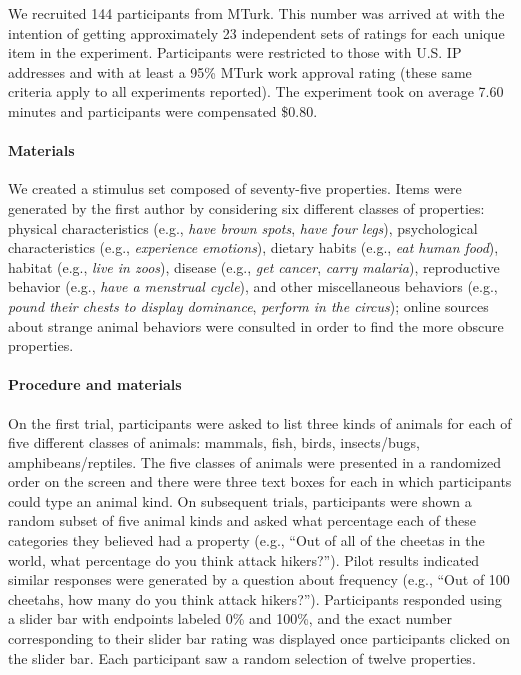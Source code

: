 \documentclass[floatsintext,doc]{apa6}
\theoremstyle{definition}
\theoremstyle{definition}
\theoremstyle{definition}
\theoremstyle{remark}
\begin{document}
We recruited 144 participants from MTurk. This number was arrived at
with the intention of getting approximately 23 independent sets of
ratings for each unique item in the experiment. Participants were
restricted to those with U.S. IP addresses and with at least a 95\%
MTurk work approval rating (these same criteria apply to all experiments
reported). The experiment took on average 7.60 minutes and participants
were compensated \$0.80.

\paragraph{Materials}\label{materials}

We created a stimulus set composed of seventy-five properties. Items
were generated by the first author by considering six different classes
of properties: physical characteristics (e.g., \emph{have brown spots},
\emph{have four legs}), psychological characteristics (e.g.,
\emph{experience emotions}), dietary habits (e.g., \emph{eat human
food}), habitat (e.g., \emph{live in zoos}), disease (e.g., \emph{get
cancer}, \emph{carry malaria}), reproductive behavior (e.g., \emph{have
a menstrual cycle}), and other miscellaneous behaviors (e.g.,
\emph{pound their chests to display dominance}, \emph{perform in the
circus}); online sources about strange animal behaviors were consulted
in order to find the more obscure properties.


\paragraph{Procedure and materials}\label{procedure-and-materials-2}

On the first trial, participants were asked to list three kinds of
animals for each of five different classes of animals: mammals, fish,
birds, insects/bugs, amphibeans/reptiles. The five classes of animals
were presented in a randomized order on the screen and there were three
text boxes for each in which participants could type an animal kind. On
subsequent trials, participants were shown a random subset of five
animal kinds and asked what percentage each of these categories they
believed had a property (e.g., \enquote{Out of all of the cheetas in the
world, what percentage do you think attack hikers?}). Pilot results
indicated similar responses were generated by a question about frequency
(e.g., \enquote{Out of 100 cheetahs, how many do you think attack
hikers?}). Participants responded using a slider bar with endpoints
labeled 0\% and 100\%, and the exact number corresponding to their
slider bar rating was displayed once participants clicked on the slider
bar. Each participant saw a random selection of twelve properties.
\end{document}
